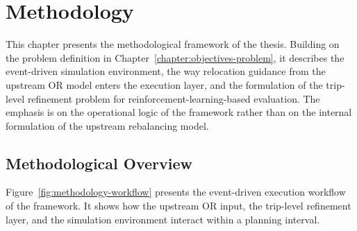 \chapter{Methodology}
\label{chapter:methodology-overview}

This chapter presents the methodological framework of the thesis. Building on the problem definition in Chapter~\ref{chapter:objectives-problem}, it describes the event-driven simulation environment, the way relocation guidance from the upstream OR model enters the execution layer, and the formulation of the trip-level refinement problem for reinforcement-learning-based evaluation. The emphasis is on the operational logic of the framework rather than on the internal formulation of the upstream rebalancing model.

\section{Methodological Overview}




Figure~\ref{fig:methodology-workflow} presents the event-driven execution workflow of the framework. It shows how the upstream OR input, the trip-level refinement layer, and the simulation environment interact within a planning interval.

